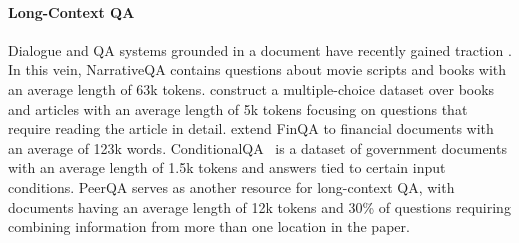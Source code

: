 \paragraph{Long-Context QA} Dialogue and QA systems grounded in a document have recently gained traction \citep{dialdoc-2023-dialdoc}. 
In this vein, NarrativeQA \citep{kocisky-etal-2018-narrativeqa} contains questions about movie scripts and books with an average length of 63k tokens. \citet{pang-etal-2022-quality} construct a multiple-choice dataset over books and articles with an average length of 5k tokens focusing on questions that require reading the article in detail. \citet{reddy-etal-2024-docfinqa} extend FinQA \citep{chen-etal-2021-finqa} to financial documents with an average of 123k words. ConditionalQA~\citep{sun-etal-2022-conditionalqa} is a dataset of government documents with an average length of 1.5k tokens and answers tied to certain input conditions. PeerQA serves as another resource for long-context QA, with documents having an average length of 12k tokens and 30\% of questions requiring combining information from more than one location in the paper.